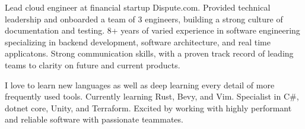 

\begin{cvparagraph}

Lead cloud engineer at financial startup Dispute.com. Provided technical leadership and onboarded a team of 3 engineers, building a strong culture of documentation and testing.
8+ years of varied experience in software engineering specializing in backend development, software architecture, and real time applicatons.
Strong communication skills, with a proven track record of leading teams to clarity on future and current products.

I love to learn new languages as well as deep learning every detail of more frequently used tools. Currently learning Rust, Bevy, and Vim. Specialist in C\#, dotnet core, Unity, and Terraform.
Excited by working with highly performant and reliable software with passionate teammates.

\end{cvparagraph}
